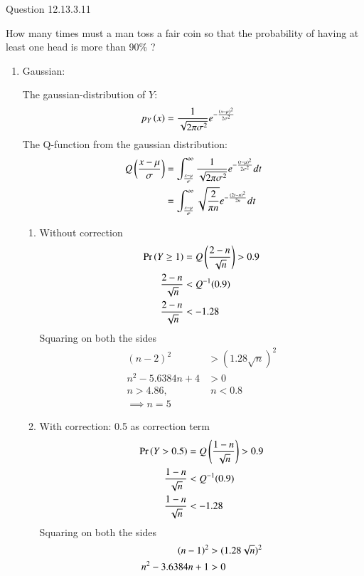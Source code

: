 \documentclass[journal,12pt,twocolumn]{IEEEtran}
\theoremstyle{remark}
\begin{document}
Question 12.13.3.11

How many times must a man toss a fair coin so that the probability of having at least
one head is more than 90\% ?

\solution
\begin{enumerate}
\begin{table}[!ht]

\end{table}

\item Gaussian:

The gaussian-distribution of $Y$:
\begin{align}
	p_Y\left(x\right) &= \frac{1}{\sqrt{2\pi{\sigma}^2}} e^{-\frac{\left(x-\mu\right)^2}{2{\sigma}^2}}\label{9.3.11}
\end{align}
The Q-function from the gaussian distribution:
\begin{align}
	Q\left(\frac{x-\mu}{\sigma}\right) &= \int_{\frac{x-\mu}{\sigma}}^{\infty}\frac{1}{\sqrt{2\pi{\sigma}^2}} e^{-\frac{\left(t-\mu\right)^2}{2{\sigma}^2}}dt\\
	&= \int_{\frac{x-\mu}{\sigma}}^{\infty}\sqrt{\frac{2}{\pi n}} e^{-\frac{\left(2t-n\right)^2}{2n}}dt
\end{align}
\begin{enumerate}
\item Without correction
\begin{align}
	\Pr\left(Y \geq 1\right) &= Q\left(\frac{2-n}{\sqrt{n}}\right)>0.9\\
	\frac{2-n}{\sqrt{n}} &< Q^{-1}(0.9)\\
	\frac{2-n}{\sqrt{n}} &< -1.28
\end{align}
Squaring on both the sides
\begin{align}
	(n-2)^2 &> (1.28\sqrt{n})^2\\
	n^2 - 5.6384n + 4 &> 0\\
	n > 4.86, &\; n < 0.8 \\
	\implies n = 5
\end{align}
\item With correction: 0.5 as correction term
\begin{align}
	\Pr\left(Y > 0.5\right) &= Q\left(\frac{1-n}{\sqrt{n}}\right)>0.9\\
	\frac{1-n}{\sqrt{n}} &< Q^{-1}(0.9)\\
	\frac{1-n}{\sqrt{n}} &< -1.28
\end{align}
Squaring on both the sides
\begin{align}
	\brak{n-1}^2 &> (1.28\sqrt{n})^2\\
	n^2 - 3.6384n + 1 &> 0\\

\end{align}
\end{enumerate}
\end{enumerate}
\end{document}
